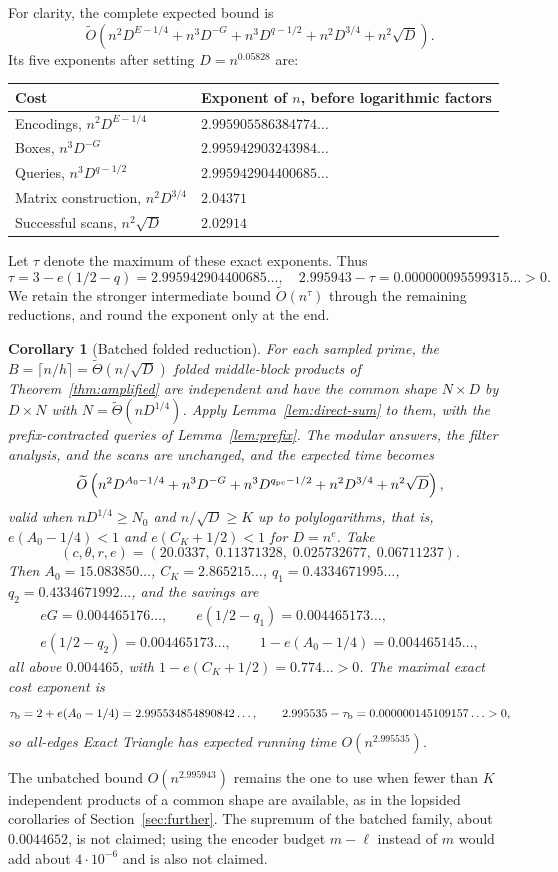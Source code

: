 \documentclass[11pt]{article}
\newtheorem{corollary}[theorem]{Corollary}
\newcommand{\softO}{\widetilde O}
\begin{document}
For clarity, the complete expected bound is
\[
\softO\left(n^2D^{E-1/4}+n^3D^{-G}+n^3D^{q-1/2}+n^2D^{3/4}+n^2\sqrt D\right).
\]
Its five exponents after setting $D=n^{0.05828}$ are:
\begin{center}
\begin{tabular}{@{}ll@{}}
\toprule
Cost & Exponent of $n$, before logarithmic factors \\
\midrule
Encodings, $n^2D^{E-1/4}$ & $2.995905586384774\ldots$ \\
Boxes, $n^3D^{-G}$ & $2.995942903243984\ldots$ \\
Queries, $n^3D^{q-1/2}$ & $2.995942904400685\ldots$ \\
Matrix construction, $n^2D^{3/4}$ & $2.04371$ \\
Successful scans, $n^2\sqrt D$ & $2.02914$ \\
\bottomrule
\end{tabular}
\end{center}
Let $\tau$ denote the maximum of these exact exponents. Thus
\[
\tau=3-e(1/2-q)=2.995942904400685\ldots,
\quad 2.995943-\tau=0.000000095599315\ldots>0.
\]
We retain the stronger intermediate bound $\softO(n^\tau)$ through the
remaining reductions, and round the exponent only at the end.

\begin{corollary}[Batched folded reduction]
\label{cor:batched}
For each sampled prime, the $B=\lceil n/h\rceil=\widetilde\Theta(n/\sqrt D)$
folded middle-block products of Theorem~\ref{thm:amplified} are independent
and have the common shape $N\times D$ by $D\times N$ with
$N=\widetilde\Theta(nD^{1/4})$. Apply Lemma~\ref{lem:direct-sum} to them,
with the prefix-contracted queries of Lemma~\ref{lem:prefix}. The modular
answers, the filter analysis, and the scans are unchanged, and the expected
time becomes
\[
\softO\left(n^2D^{A_0-1/4}+n^3D^{-G}+n^3D^{q_{\rm pc}-1/2}+n^2D^{3/4}+n^2\sqrt D\right),
\]
valid when $nD^{1/4}\ge N_0$ and $n/\sqrt D\ge K$ up to polylogarithms, that
is, $e(A_0-1/4)<1$ and $e(C_K+1/2)<1$ for $D=n^e$. Take
\[
(c,\theta,r,e)=(20.0337,\;0.11371328,\;0.025732677,\;0.06711237).
\]
Then $A_0=15.083850\ldots$, $C_K=2.865215\ldots$,
$q_1=0.4334671995\ldots$, $q_2=0.4334671992\ldots$, and the savings are
\begin{gather*}
eG=0.004465176\ldots,\qquad e(1/2-q_1)=0.004465173\ldots,\\
e(1/2-q_2)=0.004465173\ldots,\qquad 1-e(A_0-1/4)=0.004465145\ldots,
\end{gather*}
all above $0.004465$, with $1-e(C_K+1/2)=0.774\ldots>0$. The maximal
exact cost exponent is
\[
\tau_{\rm b}=2+e(A_0-1/4)=2.995534854890842\ldots,\qquad
2.995535-\tau_{\rm b}=0.000000145109157\ldots>0,
\]
so all-edges Exact Triangle has expected running time $O(n^{2.995535})$.
\end{corollary}
The unbatched bound $O(n^{2.995943})$ remains the one to use when fewer than
$K$ independent products of a common shape are available, as in the
lopsided corollaries of Section~\ref{sec:further}. The supremum of the
batched family, about $0.0044652$, is not claimed; using the encoder budget
$m-\ell$ instead of $m$ would add about $4\cdot10^{-6}$ and is also not
claimed.
\end{document}
